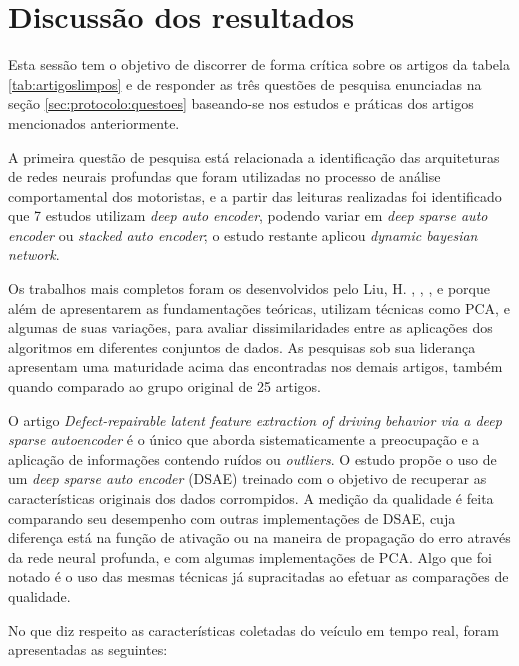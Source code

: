 \documentclass[10pt,journal,compsoc]{IEEEtran}
\begin{document}
\section{Discussão dos resultados}
\label{sec:discussao}
Esta sessão tem o objetivo de discorrer de forma crítica sobre os
artigos da tabela \ref{tab:artigoslimpos} e de responder as três questões
de pesquisa enunciadas na seção \ref{sec:protocolo:questoes}
baseando-se nos estudos e práticas dos artigos mencionados anteriormente.

A primeira questão de pesquisa está relacionada a identificação
das arquiteturas de redes neurais profundas que foram utilizadas no
processo de análise comportamental dos motoristas, e a partir das
leituras realizadas foi identificado que 7 estudos utilizam
\textit{deep auto encoder}, podendo variar em \textit{deep sparse auto
encoder} ou
\textit{stacked auto encoder}; o estudo restante aplicou
\textit{dynamic bayesian network}.

Os trabalhos mais completos foram
os desenvolvidos pelo Liu, H. \cite{Liu20151054}, \cite{Liu2016},
\cite{Liu20141427}, \cite{Liu20172477} e \cite{Liu2018} porque além de apresentarem
as fundamentações teóricas, utilizam técnicas como PCA, e algumas de
suas variações, para avaliar
dissimilaridades entre as aplicações dos algoritmos em diferentes
conjuntos de dados. As pesquisas sob sua liderança apresentam uma
maturidade acima das encontradas nos demais artigos, também quando
comparado ao grupo original de 25 artigos.

O artigo \textit{Defect-repairable latent feature extraction of driving behavior via a deep sparse autoencoder} \cite{Liu2018} é o único que aborda sistematicamente a
preocupação e a aplicação de informações contendo ruídos ou \textit{outliers}. O
estudo propõe o uso de um \textit{deep sparse auto encoder} (DSAE) treinado
com o objetivo de recuperar as características originais dos dados
corrompidos. A medição da qualidade é feita comparando seu desempenho
com outras implementações de DSAE, cuja diferença está na função de
ativação ou na maneira de propagação do erro através da rede neural
profunda, e com algumas implementações de PCA. Algo que foi
notado é o uso das mesmas técnicas já supracitadas ao efetuar as
comparações de qualidade.

No que diz respeito as características coletadas do veículo em tempo
real, foram apresentadas as seguintes:
\end{document}

